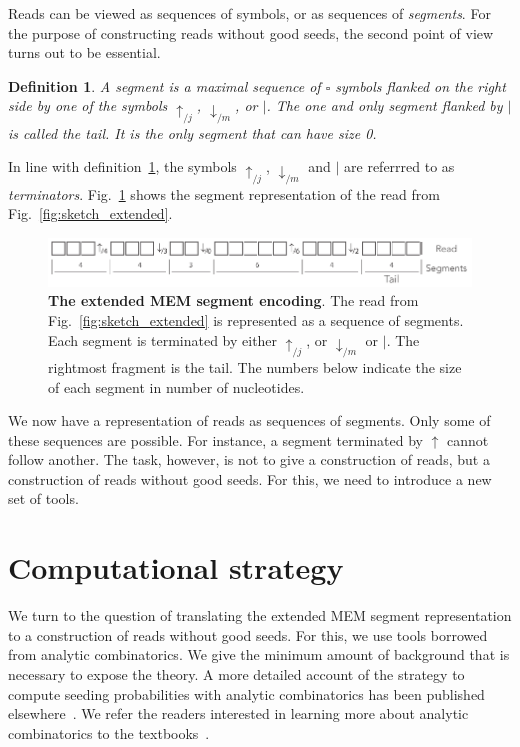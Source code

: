 \documentclass{article}
\newtheorem{definition}{Definition}
\begin{document}
Reads can be viewed as sequences of symbols, or as sequences of
\emph{segments}. For the purpose of constructing reads without good seeds,
the second point of view turns out to be essential.

\begin{definition}
\label{def:segment}
A segment is a maximal sequence of $\square$ symbols flanked on the right
side by one of the symbols $\uparrow_{/j}$, $\downarrow_{/m}$, or $|$. The
one and only segment flanked by $|$ is called the tail. It is the only
segment that can have size 0.
\end{definition}

In line with definition~\ref{def:segment}, the symbols $\uparrow_{/j}$,
$\downarrow_{/m}$ and $|$ are referrred to as \emph{terminators}.
Fig.~\ref{fig:sketch_segment} shows the segment representation of the read
from Fig.~\ref{fig:sketch_extended}.

\begin{figure}[h]
\centering
\includegraphics[scale=.85]{sketch_segments.pdf}
\caption{\textbf{The extended MEM segment encoding}.
The read from Fig.~\ref{fig:sketch_extended} is represented as a sequence
of segments. Each segment is terminated by either $\uparrow_{/j}$, or
$\downarrow_{/m}$ or $|$. The rightmost fragment is the tail. The numbers
below indicate the size of each segment in number of nucleotides.}
\label{fig:sketch_segment}
\end{figure}


We now have a representation of reads as sequences of segments. Only some
of these sequences are possible. For instance, a segment terminated by
$\uparrow$ cannot follow another. The task, however, is not to give a
construction of reads, but a construction of reads without good seeds. For
this, we need to introduce a new set of tools.


\section{Computational strategy}
\label{sec:symbolic}

We turn to the question of translating the extended MEM segment
representation to a construction of reads without good seeds. For this, we
use tools borrowed from analytic combinatorics. We give the minimum amount
of background that is necessary to expose the theory. A more detailed
account of the strategy to compute seeding probabilities with analytic
combinatorics has been published
elsewhere~\cite{filion2017analytic,filion2018analytic}. We refer the
readers interested in learning more about analytic combinatorics to the
textbooks~\cite{flajolet2009analytic,sedgewick2013introduction}.
\end{document}
